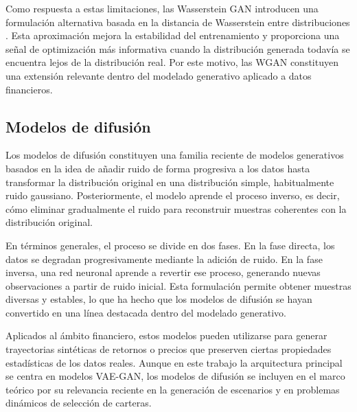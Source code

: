 Como respuesta a estas limitaciones, las Wasserstein GAN introducen una formulación alternativa basada en la distancia de Wasserstein entre distribuciones \cite{arjovsky2017wasserstein}. Esta aproximación mejora la estabilidad del entrenamiento y proporciona una señal de optimización más informativa cuando la distribución generada todavía se encuentra lejos de la distribución real. Por este motivo, las WGAN constituyen una extensión relevante dentro del modelado generativo aplicado a datos financieros.

\subsection{Modelos de difusión}

Los modelos de difusión constituyen una familia reciente de modelos generativos basados en la idea de añadir ruido de forma progresiva a los datos hasta transformar la distribución original en una distribución simple, habitualmente ruido gaussiano. Posteriormente, el modelo aprende el proceso inverso, es decir, cómo eliminar gradualmente el ruido para reconstruir muestras coherentes con la distribución original.

En términos generales, el proceso se divide en dos fases. En la fase directa, los datos se degradan progresivamente mediante la adición de ruido. En la fase inversa, una red neuronal aprende a revertir ese proceso, generando nuevas observaciones a partir de ruido inicial. Esta formulación permite obtener muestras diversas y estables, lo que ha hecho que los modelos de difusión se hayan convertido en una línea destacada dentro del modelado generativo.

Aplicados al ámbito financiero, estos modelos pueden utilizarse para generar trayectorias sintéticas de retornos o precios que preserven ciertas propiedades estadísticas de los datos reales. Aunque en este trabajo la arquitectura principal se centra en modelos VAE-GAN, los modelos de difusión se incluyen en el marco teórico por su relevancia reciente en la generación de escenarios y en problemas dinámicos de selección de carteras.


